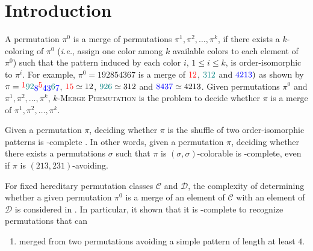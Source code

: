 \section{Introduction}
\label{section:Introduction}

A permutation $\pi^0$ is a merge of permutations 
$\pi^1, \pi^2, \dots, \pi^k$, 
if there exists a $k$-coloring of $\pi^0$ (\emph{i.e.}, assign one color
among $k$ available colors to each element of $\pi^0$) such that the
pattern induced by each color $i$, $1 \leq i \leq k$, is order-isomorphic
to $\pi^i$.
For example, $\pi^0 = 192854367$ is a merge of  
${\color{red}12}$, ${\color{teal}312}$ and ${\color{blue}4213})$
as shown by 
$\pi = 
\raisebox{2pt}{{\color{red}1}}
\raisebox{0pt}{{\color{teal}92}}
\raisebox{-2pt}{{\color{blue}8}}
\raisebox{2pt}{{\color{red}5}}
\raisebox{-2pt}{{\color{blue}43}}
\raisebox{0pt}{{\color{teal}6}}
\raisebox{-2pt}{{\color{blue}7}}$,
${\color{red}15} \simeq 12$,
${\color{teal}926} \simeq 312$ and
${\color{blue}8437} \simeq 4213$.
Given permutations $\pi^0$ and $\pi^1, \pi^2, \dots, \pi^k$,
\textsc{$k$-Merge Permutation} is the problem to decide whether $\pi$
is a merge of $\pi^1, \pi^2, \dots, \pi^k$.

Given a permutation $\pi$, deciding whether $\pi$ is the shuffle of 
two order-isomorphic patterns is \NP-complete \cite{DBLP:journals/tcs/GiraudoV18}.
In other words, given a permutation $\pi$, deciding whether 
there exists a permutations $\sigma$ such that $\pi$ is 
$(\sigma, \sigma)$-colorable is \NP-complete,
even if $\pi$ is $(213, 231)$-avoiding.


For fixed hereditary permutation classes $\mathcal{C}$ and $\mathcal{D}$,
the complexity of determining whether a given permutation $\pi^0$ is a merge of an element of
$\mathcal{C}$ with an element of $\mathcal{D}$ is considered in
\cite{DBLP:conf/esa/JelinekOV18}.
In particular, it shown that it is \NP-complete to recognize permutations that can \begin{enumerate}
  \item merged from two permutations avoiding a simple pattern of length at least $4$.
\end{enumerate}